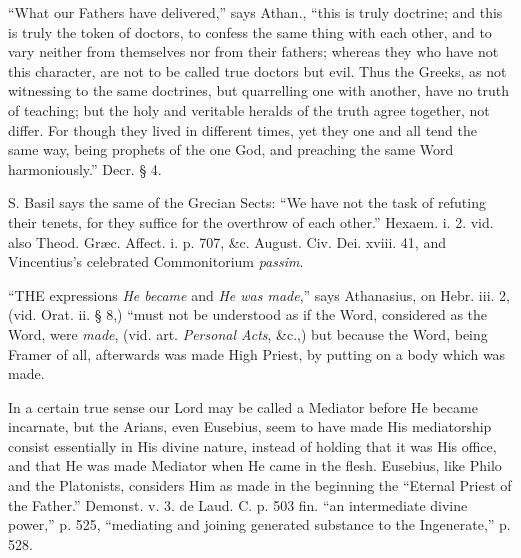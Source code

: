 ``What
our Fathers have delivered,'' says Athan., ``this is truly doctrine; and
this is truly the token of doctors, to confess the same thing with
each other, and to vary neither from themselves nor from their
fathers; whereas they who have not this character, are not to be
called true doctors but evil. Thus the Greeks, as not witnessing to
the same doctrines, but quarrelling one with another, have no truth of
teaching; but the holy and veritable heralds of the truth agree
together, not differ. For though they lived in different times, yet
they one and all tend the same way, being prophets of the one God, and
preaching the same Word harmoniously.'' Decr. § 4.

S.
Basil says the same of the Grecian Sects: ``We have not the task of
refuting their tenets, for they suffice for the overthrow of each
other.'' Hexaem. i. 2. vid. also Theod. Græc. Affect. i. p. 707,
\&c. August. Civ. Dei. xviii. 41, and Vincentius's celebrated
Commonitorium \emph{passim}.


``THE
expressions \emph{He became} and \emph{He was made},'' says Athanasius,
on Hebr. iii. 2, (vid. Orat. ii. § 8,) ``must not be understood as if
the Word, considered as the Word, were \emph{made}, (vid. art. \emph{Personal
Acts}, \&c.,) but because the Word, being Framer of all,
afterwards was made High Priest, by putting on a body which was made.

In
a certain true sense our Lord may be called a Mediator before He
became incarnate, but the Arians, even Eusebius, seem to have made His
mediatorship consist essentially in His divine nature, instead of
holding that it was His office, and that He was made Mediator when He
came in the flesh. Eusebius, like Philo and the Platonists, considers
Him as made in the beginning the ``Eternal Priest of the Father.''
Demonst. v. 3. de Laud. C. p. 503 fin. ``an intermediate divine power,''
p. 525, ``mediating and joining generated substance to the Ingenerate,''
p. 528.

